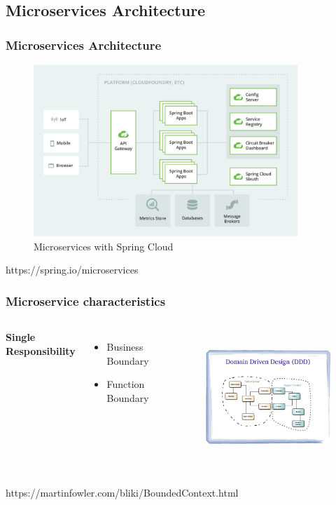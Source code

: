 \documentclass{beamer}
\begin{document}
	\subsection {Microservices Architecture}
		\begin{frame}
			\frametitle{Microservices Architecture}
				\begin{figure}[h]
					\includegraphics[width=100mm, scale=2]{img/microservice-diagrame.png}
					\caption{Microservices with Spring Cloud}
				\end{figure}\vspace{20mm}

				\tiny{https://spring.io/microservices}	
		\end{frame}
	
		\begin{frame}
			\frametitle{Microservice characteristics}
				\begin{columns}[c]
					\column{.40\textwidth} 
						\hspace{2mm} \textbf {Single Responsibility}
						\begin{itemize}
							\item Business Boundary
							\item Function Boundary
						\end{itemize}
					
						\begin{figure}[h]
							\includegraphics[width=70mm, height=50mm, scale=1]{img/ddd.jpg}
						\end{figure}\vspace{1mm}
				\end{columns}
			
			\vspace{10mm}
			\tiny{https://martinfowler.com/bliki/BoundedContext.html}
		\end{frame}
\end{document}

